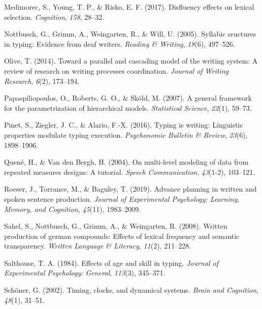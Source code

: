 \documentclass[
  english,
  man,mask,floatsintext]{apa7}
\newlength{\cslhangindent}
\newenvironment{cslreferences}%
  {\setlength{\parindent}{0pt}%
  \everypar{\setlength{\hangindent}{\cslhangindent}}\ignorespaces}%
  {\par}
\begin{document}
\begin{cslreferences}
\leavevmode\hypertarget{ref-medimorec2017disfluency}{}%
Medimorec, S., Young, T. P., \& Risko, E. F. (2017). Disfluency effects on lexical selection. \emph{Cognition}, \emph{158}, 28--32.

\leavevmode\hypertarget{ref-not05}{}%
Nottbusch, G., Grimm, A., Weingarten, R., \& Will, U. (2005). Syllabic sructures in typing: Evidence from deaf writers. \emph{Reading \& Writing}, \emph{18}(6), 497--526.

\leavevmode\hypertarget{ref-olive2014toward}{}%
Olive, T. (2014). Toward a parallel and cascading model of the writing system: A review of research on writing processes coordination. \emph{Journal of Writing Research}, \emph{6}(2), 173--194.

\leavevmode\hypertarget{ref-papaspiliopoulos2007general}{}%
Papaspiliopoulos, O., Roberts, G. O., \& Sköld, M. (2007). A general framework for the parametrization of hierarchical models. \emph{Statistical Science}, \emph{22}(1), 59--73.

\leavevmode\hypertarget{ref-pinet2016typing}{}%
Pinet, S., Ziegler, J. C., \& Alario, F.-X. (2016). Typing is writing: Linguistic properties modulate typing execution. \emph{Psychonomic Bulletin \& Review}, \emph{23}(6), 1898--1906.

\leavevmode\hypertarget{ref-quene2004multi}{}%
Quené, H., \& Van den Bergh, H. (2004). On multi-level modeling of data from repeated measures designs: A tutorial. \emph{Speech Communication}, \emph{43}(1-2), 103--121.

\leavevmode\hypertarget{ref-roeser2019advance}{}%
Roeser, J., Torrance, M., \& Baguley, T. (2019). Advance planning in written and spoken sentence production. \emph{Journal of Experimental Psychology: Learning, Memory, and Cognition}, \emph{45}(11), 1983--2009.

\leavevmode\hypertarget{ref-sah08}{}%
Sahel, S., Nottbusch, G., Grimm, A., \& Weingarten, R. (2008). Written production of german compounds: Effects of lexical frequency and semantic transparency. \emph{Written Language \& Literacy}, \emph{11}(2), 211--228.

\leavevmode\hypertarget{ref-salthouse1984effects}{}%
Salthouse, T. A. (1984). Effects of age and skill in typing. \emph{Journal of Experimental Psychology: General}, \emph{113}(3), 345--371.

\leavevmode\hypertarget{ref-schoner2002timing}{}%
Schöner, G. (2002). Timing, clocks, and dynamical systems. \emph{Brain and Cognition}, \emph{48}(1), 31--51.


\end{cslreferences}
\end{document}
